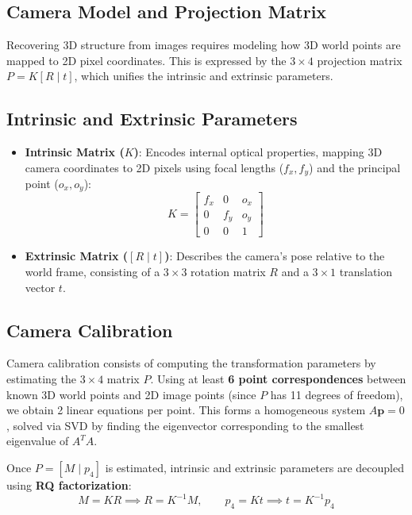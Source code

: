 
\section[Question -- {\it Recovering 3D Structure from 2 Calibrated Images}]{}

\subsection{Camera Model and Projection Matrix}
Recovering 3D structure from images requires modeling how 3D world points are mapped to 2D pixel coordinates. This is expressed by the $3 \times 4$ projection matrix $P = K[R \mid t]$, which unifies the intrinsic and extrinsic parameters.

\subsection{Intrinsic and Extrinsic Parameters}
\begin{itemize}
    \item \textbf{Intrinsic Matrix ($K$)}: Encodes internal optical properties, mapping 3D camera coordinates to 2D pixels using focal lengths ($f_x, f_y$) and the principal point ($o_x, o_y$):
    \[
      K = \begin{bmatrix} f_x & 0 & o_x \\ 0 & f_y & o_y \\ 0 & 0 & 1 \end{bmatrix}
    \]
    \item \textbf{Extrinsic Matrix ($[R \mid t]$)}: Describes the camera's pose relative to the world frame, consisting of a $3 \times 3$ rotation matrix $R$ and a $3 \times 1$ translation vector $t$.
\end{itemize}

\subsection{Camera Calibration}
Camera calibration consists of computing the transformation parameters by estimating the $3 \times 4$ matrix $P$. 
Using at least \textbf{6 point correspondences} between known 3D world points and 2D image points (since $P$ has 11 degrees of freedom), we obtain 2 linear equations per point. This forms a homogeneous system $A\mathbf{p} = 0$, solved via SVD by finding the eigenvector corresponding to the smallest eigenvalue of $A^T A$. 

Once $P = [M \mid p_4]$ is estimated, intrinsic and extrinsic parameters are decoupled using \textbf{RQ factorization}:
\[
  M = KR \implies R = K^{-1}M, \qquad p_4 = Kt \implies t = K^{-1}p_4
\]

